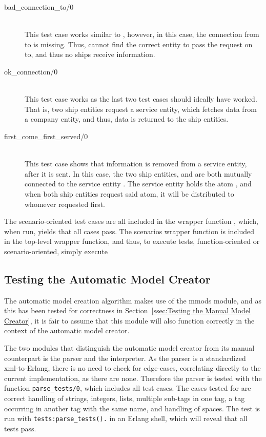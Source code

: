 \begin{description}
  \item[{bad\_connection\_to/0}]\ \\
    This test case works similar to , however, in this case, the connection from  to  is missing. Thus,  cannot find the correct entity to pass the request on to, and thus no ships receive information.
  \item[{ok\_connection/0}]\ \\
    This test case works as the last two test cases should ideally have worked. That is, two ship entities request a service entity, which fetches data from a company entity, and thus, data is returned to the ship entities.
  \item[{first\_come\_first\_served/0}]\ \\
    This test case shows that information is removed from a service entity, after it is sent. In this case, the two ship entities,  and  are both mutually connected to the service entity . The service entity holds the atom , and when both ship entities request said atom, it will be distributed to whomever requested first. 
\end{description}
\noindent
The scenario-oriented test cases are all included in the wrapper function , which, when run, yields that all cases pass. The scenarios wrapper function is included in the top-level wrapper function, and thus, to execute  tests, function-oriented or scenario-oriented, simply execute 

\subsection{Testing the Automatic Model Creator}

The automatic model creation algorithm makes use of the mmods module, and as this has been tested for correctness in Section~\ref{ssec:Testing the Manual Model Creator}, it is fair to assume that this module will also function correctly in the context of the automatic model creator. 

The two modules that distinguish the automatic model creator from its manual counterpart is the parser and the interpreter. As the parser is a standardized xml-to-Erlang, there is no need to check for edge-cases, correlating directly to the current implementation, as there are none. Therefore the parser is tested with the function \lstinline{parse_tests/0}, which includes all test cases. The cases tested for are correct handling of strings, integers, lists, multiple sub-tags in one tag, a tag occurring in another tag with the same name, and handling of spaces. The test is run with \lstinline{tests:parse_tests().} in an Erlang shell, which will reveal that all tests pass.

